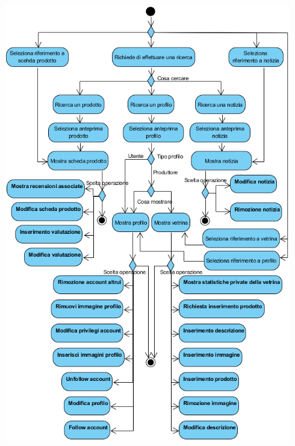 \begin{center}
	\includegraphics[width=0.94\textwidth]{assets/visualParadigm/attivita/ricerche}
\end{center}


